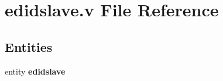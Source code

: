 \section{edidslave.\-v File Reference}
\label{edidslave_8v}
\subsection*{Entities}
\begin{DoxyCompactItemize}
\item 
entity {\bf edidslave}
\end{DoxyCompactItemize}
